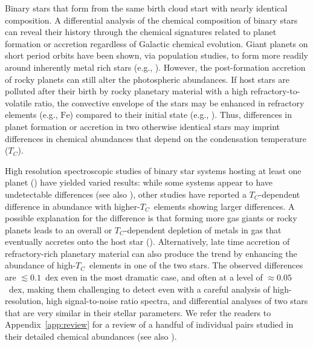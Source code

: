 \documentclass[modern, letterpaper]{aastex61}
\newcommand*\elem[1]{\ensuremath{\mathrm{#1}}}
\newcommand{\Tcondens}{\ensuremath{T_C}}
\begin{document}
Binary stars that form from the same birth cloud start with nearly identical
composition.
A differential analysis of the chemical composition of binary stars can reveal
their history through the chemical signatures related to planet formation or
accretion regardless of Galactic chemical evolution.
Giant planets on short period orbits have been shown, via
population studies, to form more readily around inherently metal rich stars
(e.g., \citealt{Fischer:2005aa,Santos2004}).
However, the post-formation accretion of rocky planets can still alter the
photospheric abundances.
If host stars are polluted after their birth by rocky planetary material with a
high refractory-to-volatile ratio, the convective envelope of the stars may be
enhanced in refractory elements (e.g., \elem{Fe}) compared to their initial
state (e.g., \citealt{Pinsonneault:2001aa}).
Thus, differences in planet formation or accretion in two otherwise identical
stars may imprint differences in chemical abundances that depend on the
condensation temperature (\Tcondens).

High resolution spectroscopic studies of binary star systems hosting at least
one planet (\citealt{2011ApJ...740...76R,2014ApJ...790L..25T,Teske:2013aa,
  Mack:2014aa,Liu:2014aa,Teske:2015aa,Saffe:2015aa,
  Ramirez:2015aa,Biazzo:2015aa,Mack:2016aa,Teske:2016aa,Teske:2016ab})
have yielded varied results:
while some systems appear to have undetectable differences
(see also \citealt{Desidera:2004aa,Gratton:2001aa}), other
studies have reported a \Tcondens-dependent difference in abundance
with higher-\Tcondens\ elements showing larger differences.
A possible explanation for the difference is that forming more gas giants or
rocky planets leads to an overall or \Tcondens-dependent depletion of metals in
gas that eventually accretes onto the host star
(\citealt{Ramirez:2015aa,Biazzo:2015aa}).
Alternatively, late time accretion of refractory-rich planetary material can
also produce the trend by enhancing the abundance of high-\Tcondens\ elements
in one of the two stars.
The observed differences are $\lesssim 0.1$~dex even in the most dramatic case,
and often at a level of $\approx 0.05$~dex, making them challenging to detect even
with a careful analysis of high-resolution, high signal-to-noise ratio spectra,
and differential analyses of two stars that are very similar in their
stellar parameters.
We refer the readers to Appendix~\ref{app:review} for a review of
a handful of individual pairs studied in their detailed chemical abundances
(see also \citealt{2016arXiv161104064M}).
\end{document}
